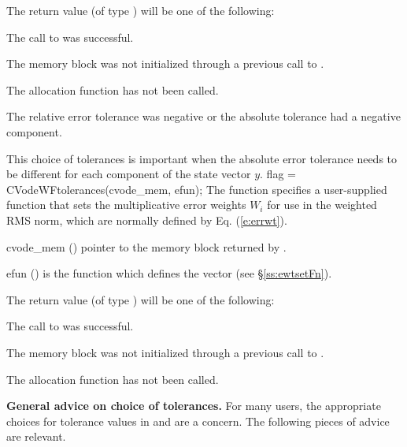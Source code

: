 {
  The return value  (of type ) will be one of the following:
  \begin{args}
  \item[\Id{CV\_SUCCESS}]
    The call to  was successful.
  \item[\Id{CV\_MEM\_NULL}] 
    The {\cvodes} memory block was not initialized through a previous call to
    .
  \item[\Id{CV\_NO\_MALLOC}] 
    The allocation function  has not been called.
  \item[\Id{CV\_ILL\_INPUT}] 
    The relative error tolerance was negative or the absolute tolerance
    had a negative component.
  \end{args}
}
{
  This choice of tolerances is important when the absolute error tolerance needs to
  be different for each component of the state vector $y$. 
}
{
  flag = CVodeWFtolerances(cvode\_mem, efun);
}
{
  The function  specifies a user-supplied function 
  that sets the multiplicative error weights $W_i$ for use in the weighted
  RMS norm, which are normally defined by Eq. (\ref{e:errwt}).
}
{
  \begin{args}
  \item[cvode\_mem] ()
    pointer to the {\cvodes} memory block returned by .
  \item[efun] () 
    is the {\CC} function which defines the  vector (see
    \S\ref{ss:ewtsetFn}).
  \end{args}
}
{
  The return value  (of type ) will be one of the following:
  \begin{args}
  \item[\Id{CV\_SUCCESS}]
    The call to  was successful.
  \item[\Id{CV\_MEM\_NULL}] 
    The {\cvodes} memory block was not initialized through a previous call to
    .
  \item[\Id{CV\_NO\_MALLOC}] 
    The allocation function  has not been called.
  \end{args}
}
{}

{\bf General advice on choice of tolerances.}
For many users, the appropriate choices for tolerance values in
 and  are a concern.  The following pieces of
advice are relevant.

